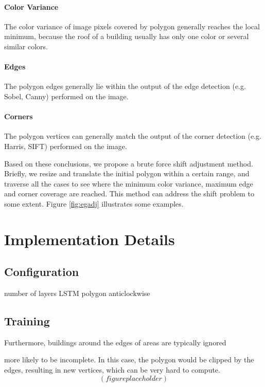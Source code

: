 

\paragraph{Color Variance}
The color variance of image pixels covered by polygon generally reaches the local minimum, because the roof of a building usually has only one color or several similar colors.

\paragraph{Edges}
The polygon edges generally lie within the output of the edge detection (e.g. Sobel, Canny) performed on the image.

\paragraph{Corners}
The polygon vertices can generally match the output of the corner detection (e.g. Harris, SIFT) performed on the image.

Based on these conclusions, we propose a brute force shift adjustment method. Briefly, we resize and translate the initial polygon within a certain range, and traverse all the cases to see where the minimum color variance, maximum edge and corner coverage are reached. This method can address the shift problem to some extent. Figure \ref{fig:egadj} illustrates some examples.

\section{Implementation Details}\label{impdet}

\subsection{Configuration}\label{config}

number of layers
LSTM
polygon anticlockwise

\subsection{Training}

Furthermore, buildings around the edges of areas are typically ignored 

more likely to be incomplete. In this case, the polygon would be clipped by the edges, resulting in new vertices, which can be very hard to compute.
$$(figure placeholder)$$

